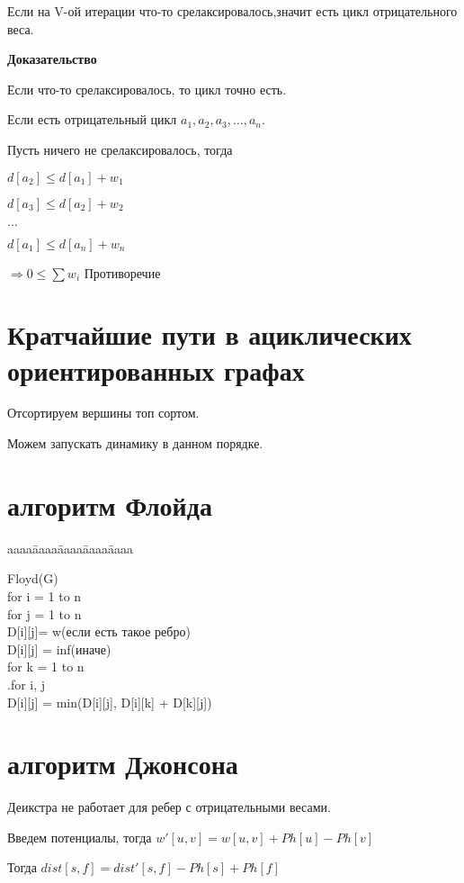 \documentclass[12pt]{article}
\def\t{\texttt}
\newenvironment{MyTabbing}{
\t\bgroup
\begin{tabbing}
aaaa\=aaaa\=aaaa\=aaaa\=aaaa\kill
}{
\end{tabbing}
\t\egroup
}
\begin{document}
Если на V-ой итерации что-то срелаксировалось,значит есть цикл отрицательного веса. 

{\bf Доказательство}

Если что-то срелаксировалось, то цикл точно есть.

Если есть отрицательный цикл $a_1, a_2, a_3, \ldots, a_n$.

Пусть ничего не срелаксировалось, тогда 

$d[a_2] \le d[a_1] + w_1$

$d[a_3] \le d[a_2] + w_2$

$\ldots$

$d[a_1] \le d[a_n] + w_n$

$\Rightarrow 0 \le \sum w_i$ Противоречие

\section{Кратчайшие пути в ациклических ориентированных графах}

Отсортируем вершины топ сортом. 

Можем запускать динамику в данном порядке. 

\section{алгоритм Флойда}

\begin{MyTabbing}
Floyd(G)\\
\>for i = 1 to n\\
\>\>for j = 1 to n\\
\>\>\>D[i][j]= w(если есть такое ребро)\\
\>\>\>D[i][j] = inf(иначе)\\
\>for k = 1 to n\\
\>\>.for i, j\\
\>\>\>D[i][j] = min(D[i][j], D[i][k] + D[k][j])\\
\end{MyTabbing}

\section{алгоритм Джонсона}

Деикстра не работает для ребер с отрицательными весами.

Введем потенциалы, тогда $w'[u, v] = w[u, v] + Ph[u] - Ph[v]$

Тогда $dist[s, f] = dist'[s,f] - Ph[s] + Ph[f]$
\end{document}
